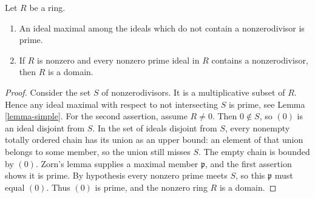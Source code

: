 \begin{lemma}
\label{lemma-characterize-domain}
Let $R$ be a ring.
\begin{enumerate}
\item An ideal maximal among the ideals which do not contain a
nonzerodivisor is prime.
\item If $R$ is nonzero and every nonzero prime ideal in $R$
contains a nonzerodivisor, then $R$ is a domain.
\end{enumerate}
\end{lemma}

\begin{proof}
Consider the set $S$ of nonzerodivisors. It is a multiplicative
subset of $R$. Hence any ideal maximal with respect to not intersecting
$S$ is prime, see
Lemma \ref{lemma-simple}.
For the second assertion, assume $R\ne0$. Then $0\notin S$,
so $(0)$ is an ideal disjoint from $S$. In the set of ideals disjoint
from $S$, every nonempty totally ordered chain has its union as an
upper bound: an element of that union belongs to some member, so
the union still misses $S$. The empty chain is bounded by $(0)$.
Zorn's lemma supplies a maximal member $\mathfrak p$, and the first
assertion shows it is prime. By hypothesis every nonzero prime
meets $S$, so this $\mathfrak p$ must equal $(0)$.
Thus $(0)$ is prime, and the nonzero ring $R$ is a domain.
\end{proof}